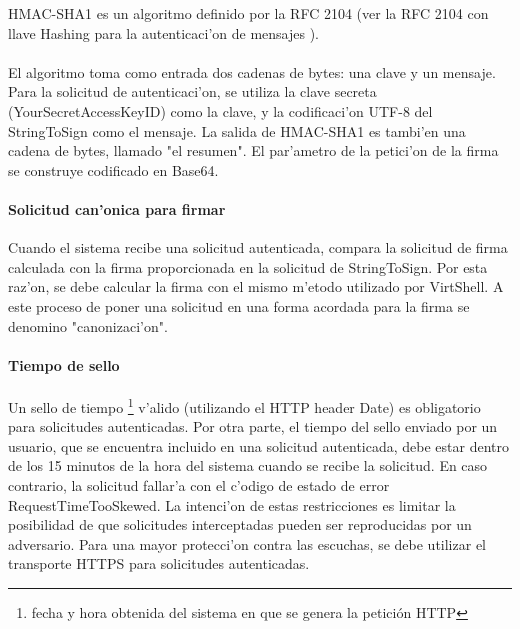 \vspace{5mm}

HMAC-SHA1 es un algoritmo definido por la RFC 2104 (ver la RFC 2104 con llave Hashing para la autenticaci'on de mensajes \cite{rfc2104}).\\
\\
El algoritmo toma como entrada dos cadenas de bytes: una clave y un mensaje. Para la solicitud de autenticaci'on, se utiliza la clave secreta (YourSecretAccessKeyID) como la clave, y la codificaci'on UTF-8 del StringToSign como el mensaje. La salida de HMAC-SHA1 es tambi'en una cadena de bytes, llamado "el resumen". El par'ametro de la petici'on de la firma se construye codificado en Base64.

\paragraph{Solicitud can'onica para firmar}

Cuando el sistema recibe una solicitud autenticada, compara la solicitud de firma calculada con la firma proporcionada en la solicitud de StringToSign. Por esta raz'on, se debe calcular la firma con el mismo m'etodo utilizado por VirtShell. A este proceso de poner una solicitud en una forma acordada para la firma se denomino "canonizaci'on".

\paragraph{Tiempo de sello}

Un sello de tiempo \footnote{fecha y hora obtenida del sistema en que se genera la petición HTTP} v'alido (utilizando el HTTP header Date) es obligatorio para solicitudes autenticadas. Por otra parte, el tiempo del sello enviado por un usuario, que se encuentra incluido en una solicitud autenticada, debe estar dentro de los 15 minutos de la hora del sistema cuando se recibe la solicitud. En caso contrario, la solicitud fallar'a con el c'odigo de estado de error RequestTimeTooSkewed. La intenci'on de estas restricciones es limitar la posibilidad de que solicitudes interceptadas pueden ser reproducidas por un adversario. Para una mayor protecci'on contra las escuchas, se debe utilizar el transporte HTTPS para solicitudes autenticadas.


